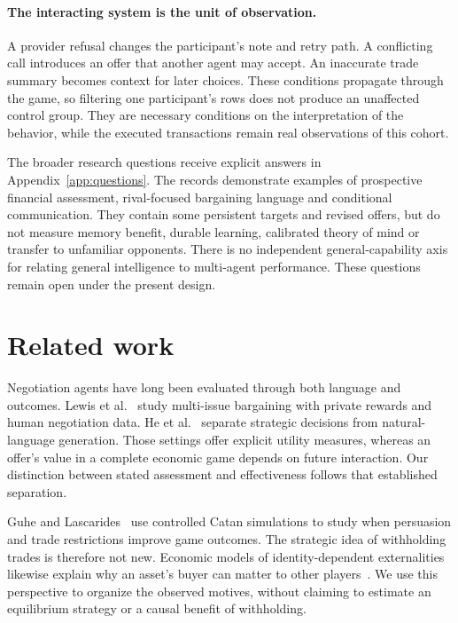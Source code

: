 \paragraph{The interacting system is the unit of observation.}
A provider refusal changes the participant's note and retry path. A conflicting call introduces an offer that another agent may accept. An inaccurate trade summary becomes context for later choices. These conditions propagate through the game, so filtering one participant's rows does not produce an unaffected control group. They are necessary conditions on the interpretation of the behavior, while the executed transactions remain real observations of this cohort.

The broader research questions receive explicit answers in Appendix~\ref{app:questions}. The records demonstrate examples of prospective financial assessment, rival-focused bargaining language and conditional communication. They contain some persistent targets and revised offers, but do not measure memory benefit, durable learning, calibrated theory of mind or transfer to unfamiliar opponents. There is no independent general-capability axis for relating general intelligence to multi-agent performance. These questions remain open under the present design.

\section{Related work}
Negotiation agents have long been evaluated through both language and outcomes. Lewis et al.~\cite{lewis2017deal} study multi-issue bargaining with private rewards and human negotiation data. He et al.~\cite{he2018decoupling} separate strategic decisions from natural-language generation. Those settings offer explicit utility measures, whereas an offer's value in a complete economic game depends on future interaction. Our distinction between stated assessment and effectiveness follows that established separation.

Guhe and Lascarides~\cite{guhe2014persuasion} use controlled Catan simulations to study when persuasion and trade restrictions improve game outcomes. The strategic idea of withholding trades is therefore not new. Economic models of identity-dependent externalities likewise explain why an asset's buyer can matter to other players~\cite{jehiel1996externalities}. We use this perspective to organize the observed motives, without claiming to estimate an equilibrium strategy or a causal benefit of withholding.

